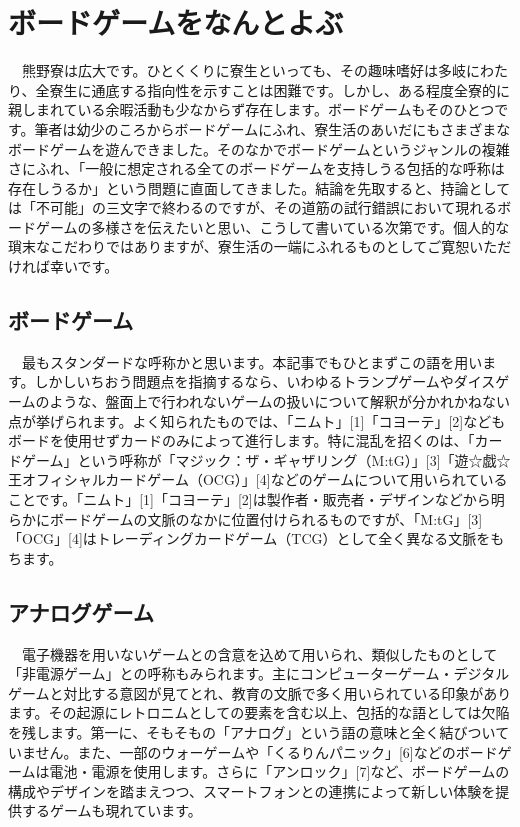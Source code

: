 \section{ボードゲームをなんとよぶ}

　熊野寮は広大です。ひとくくりに寮生といっても、その趣味嗜好は多岐にわたり、全寮生に通底する指向性を示すことは困難です。しかし、ある程度全寮的に親しまれている余暇活動も少なからず存在します。ボードゲームもそのひとつです。筆者は幼少のころからボードゲームにふれ、寮生活のあいだにもさまざまなボードゲームを遊んできました。そのなかでボードゲームというジャンルの複雑さにふれ、「一般に想定される全てのボードゲームを支持しうる包括的な呼称は存在しうるか」という問題に直面してきました。結論を先取すると、持論としては「不可能」の三文字で終わるのですが、その道筋の試行錯誤において現れるボードゲームの多様さを伝えたいと思い、こうして書いている次第です。個人的な瑣末なこだわりではありますが、寮生活の一端にふれるものとしてご寛恕いただければ幸いです。

\subsection{ボードゲーム}
　最もスタンダードな呼称かと思います。本記事でもひとまずこの語を用います。しかしいちおう問題点を指摘するなら、いわゆるトランプゲームやダイスゲームのような、盤面上で行われないゲームの扱いについて解釈が分かれかねない点が挙げられます。よく知られたものでは、「ニムト」[1]「コヨーテ」[2]などもボードを使用せずカードのみによって進行します。特に混乱を招くのは、「カードゲーム」という呼称が「マジック：ザ・ギャザリング（M:tG）」[3]「遊☆戯☆王オフィシャルカードゲーム（OCG）」[4]などのゲームについて用いられていることです。「ニムト」[1]「コヨーテ」[2]は製作者・販売者・デザインなどから明らかにボードゲームの文脈のなかに位置付けられるものですが、「M:tG」[3]「OCG」[4]はトレーディングカードゲーム（TCG）として全く異なる文脈をもちます。

\subsection{アナログゲーム}
　電子機器を用いないゲームとの含意を込めて用いられ、類似したものとして「非電源ゲーム」との呼称もみられます。主にコンピューターゲーム・デジタルゲームと対比する意図が見てとれ、教育の文脈で多く用いられている印象があります。その起源にレトロニムとしての要素を含む以上、包括的な語としては欠陥を残します。第一に、そもそもの「アナログ」という語の意味と全く結びついていません。また、一部のウォーゲームや「くるりんパニック」[6]などのボードゲームは電池・電源を使用します。さらに「アンロック」[7]など、ボードゲームの構成やデザインを踏まえつつ、スマートフォンとの連携によって新しい体験を提供するゲームも現れています。

